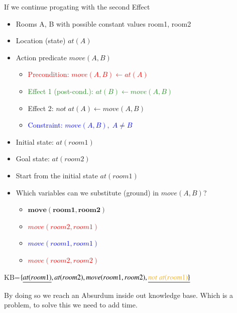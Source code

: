 If we continue progating with the second Effect

\begin{minipage}[t]{0.5\textwidth}
    \begin{itemize}
        \item Rooms A, B with possible constant values room1, room2
        \item Location (state) $at(A)$
        \item Action predicate $move(A, B)$
        \begin{itemize}
            \item \textcolor{red}{Precondition: $move(A, B) \leftarrow at(A)$}
            \item \textcolor{ForestGreen}{Effect 1 (post-cond.): $at(B) \leftarrow move(A, B)$}
            \item \textcolor{Dandelion}{Effect 2: $not\;at(A) \leftarrow move(A, B)$}
            \item \textcolor{blue}{Constraint: $move(A, B),\;A \ne B$}
        \end{itemize}
        \item Initial state: $at(room1)$
        \item Goal state: $at(room2)$
    \end{itemize}
\end{minipage}
\begin{minipage}[t]{0.8\textwidth}
    \begin{itemize}
        \item Start from the initial state $at(room1)$
        \item Which variables can we substitute (ground) in $move(A, B)$?
        \begin{itemize}
            \item $\bm{move(room1, room2)}$
            \item \textcolor{red}{\st{$move(room2, room1)$}}
            \item \textcolor{blue}{\st{$move(room1, room1)$}}
            \item \textcolor{red}{\st{$move(room2, room2)$}}
        \end{itemize}
    \end{itemize}
\end{minipage}
\singlespacing

KB=$\{\underline{at(room1)}, at(room2), move(room1,room2), \underline{\textcolor{Dandelion}{not\;at(room1)}\}}$

By doing so we reach an Absurdum inside out knowledge base. Which is a problem, to solve this we need to add time.
